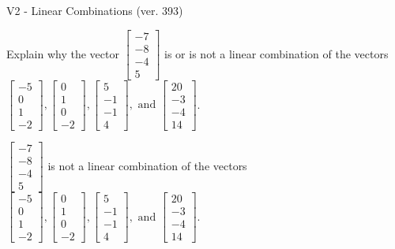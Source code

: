 \begin{exercise}
  \begin{exerciseTitle}V2 - Linear Combinations (ver. 393)\end{exerciseTitle}
  \begin{exerciseStatement}
    Explain why the vector \(\left[\begin{array}{c}
-7 \\
-8 \\
-4 \\
5
\end{array}\right]\)  is or is not a linear 
	combination of the vectors \(\left[\begin{array}{c}
-5 \\
0 \\
1 \\
-2
\end{array}\right] , \left[\begin{array}{c}
0 \\
1 \\
0 \\
-2
\end{array}\right] , \left[\begin{array}{c}
5 \\
-1 \\
-1 \\
4
\end{array}\right] , \text{ and } \left[\begin{array}{c}
20 \\
-3 \\
-4 \\
14
\end{array}\right]\).
	


  \end{exerciseStatement}
  \begin{exerciseAnswer}
   \(\left[\begin{array}{c}
-7 \\
-8 \\
-4 \\
5
\end{array}\right]\) 
  	 is not  
	a linear combination of the vectors \(\left[\begin{array}{c}
-5 \\
0 \\
1 \\
-2
\end{array}\right] , \left[\begin{array}{c}
0 \\
1 \\
0 \\
-2
\end{array}\right] , \left[\begin{array}{c}
5 \\
-1 \\
-1 \\
4
\end{array}\right] , \text{ and } \left[\begin{array}{c}
20 \\
-3 \\
-4 \\
14
\end{array}\right]\).


\end{exerciseAnswer}
\end{exercise}
